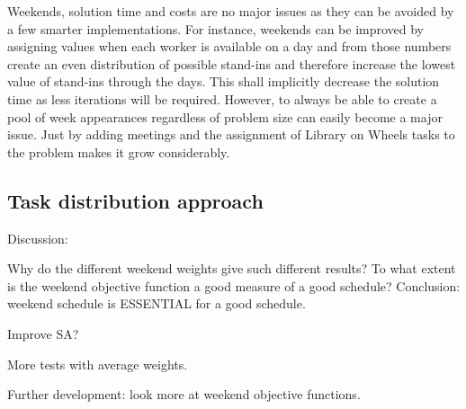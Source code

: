  Weekends, solution time and costs are no major issues as they can be avoided by a few smarter implementations. For instance, weekends can be improved by assigning values when each worker is available on a day and from those numbers create an even distribution of possible stand-ins and therefore increase the lowest value of stand-ins through the days. This shall implicitly decrease the solution time as less iterations will be required. However, to always be able to create a pool of week appearances regardless of problem size can easily become a major issue. Just by adding meetings and the assignment of Library on Wheels tasks to the problem makes it grow considerably.
 

\subsection{Task distribution approach}
Discussion: 

Why do the different weekend weights give such different results?
To what extent is the weekend objective function a good measure of a good schedule?
Conclusion: weekend schedule is ESSENTIAL for a good schedule.

Improve SA?

More tests with average weights.

Further development: look more at weekend objective functions.